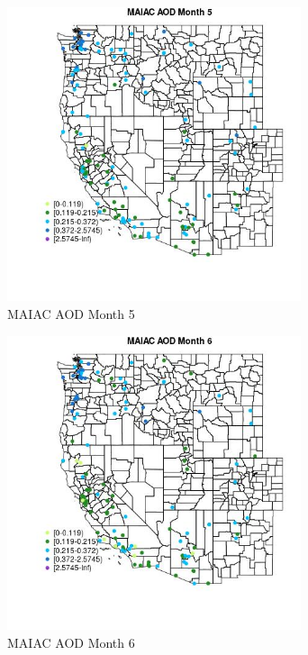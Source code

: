 \begin{figure} 
\centering  
\includegraphics[width=0.77\textwidth]{Code_Outputs/Report_ML_input_PM25_Step4_part_e_de_duplicated_aves_MapObsMo5MAIAC_AOD.jpg} 
\caption{\label{fig:Report_ML_input_PM25_Step4_part_e_de_duplicated_avesMapObsMo5MAIAC_AOD}MAIAC AOD Month 5} 
\end{figure} 
 

\begin{figure} 
\centering  
\includegraphics[width=0.77\textwidth]{Code_Outputs/Report_ML_input_PM25_Step4_part_e_de_duplicated_aves_MapObsMo6MAIAC_AOD.jpg} 
\caption{\label{fig:Report_ML_input_PM25_Step4_part_e_de_duplicated_avesMapObsMo6MAIAC_AOD}MAIAC AOD Month 6} 
\end{figure} 
 

